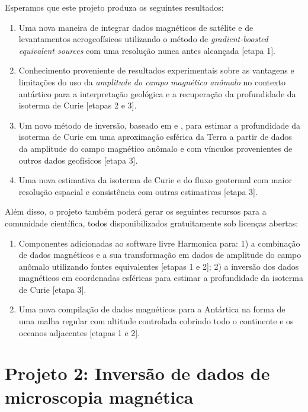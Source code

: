 \documentclass[12pt,a4paper,oneside]{book}
\begin{document}
\noindent
Esperamos que este projeto produza os seguintes resultados:

\begin{enumerate}
  \item Uma nova maneira de integrar dados magnéticos de satélite e de
    levantamentos aerogeofísicos utilizando o método de
    \textit{gradient-boosted equivalent sources} \citep{Soler2021} com uma
    resolução nunca antes alcançada [etapa 1].
  \item Conhecimento proveniente de resultados experimentais sobre as vantagens
    e limitações do uso da \textit{amplitude do campo magnético anômalo} no
    contexto antártico para a interpretação geológica \citep{Melo2021} e a
    recuperação da profundidade da isoterma de Curie \citep{HidalgoGato2021}
    [etapas 2 e 3].
  \item Um novo método de inversão, baseado em \citet{Uieda2017} e
    \citet{HidalgoGato2021}, para estimar a profundidade da isoterma de Curie
    em uma aproximação esférica da Terra a partir de dados da amplitude do
    campo magnético anômalo e com vínculos provenientes de outros dados
    geofísicos [etapa 3].
  \item Uma nova estimativa da isoterma de Curie e do fluxo geotermal com maior
    resolução espacial e consistência com outras estimativas [etapa 3].
\end{enumerate}

\noindent
Além disso, o projeto também poderá gerar os seguintes recursos para a
comunidade científica, todos disponibilizados gratuitamente sob licenças
abertas:

\begin{enumerate}
  \item Componentes adicionadas ao software livre Harmonica para:
    1) a combinação de dados magnéticos e a sua transformação em dados de
       amplitude do campo anômalo utilizando fontes equivalentes [etapas 1 e
       2];
    2) a inversão dos dados magnéticos em coordenadas esféricas para estimar a
       profundidade da isoterma de Curie [etapa 3].
  \item Uma nova compilação de dados magnéticos para a Antártica na forma de
    uma malha regular com altitude controlada cobrindo todo o continente e os
    oceanos adjacentes [etapas 1 e 2].
\end{enumerate}


\section{Projeto 2: Inversão de dados de microscopia magnética}
\end{document}
